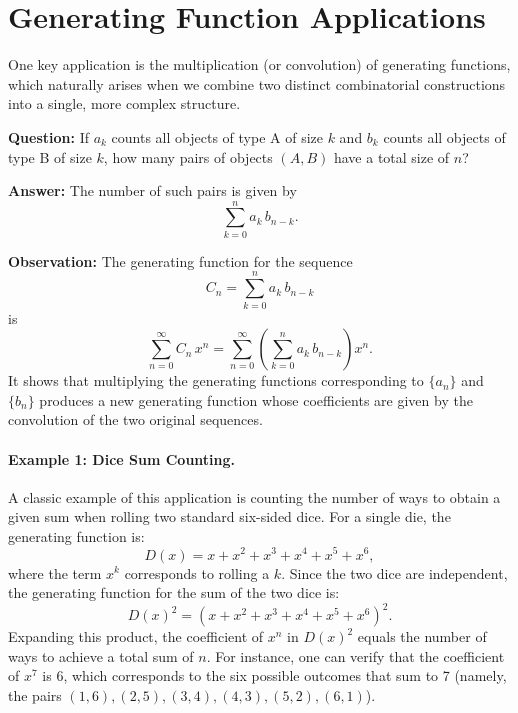 \documentclass[docmute]{article}
\begin{document}
\section{Generating Function Applications}

One key application is the multiplication (or convolution) of generating functions, which naturally arises when we combine two distinct combinatorial constructions into a single, more complex structure.

\textbf{Question:} If \(a_k\) counts all objects of type A of size \(k\) and \(b_k\) counts all objects of type B of size \(k\), how many pairs of objects \((A, B)\) have a total size of \(n\)?

\textbf{Answer:} The number of such pairs is given by
\[
\sum_{k=0}^{n} a_k\, b_{n-k}.
\]

\textbf{Observation:} The generating function for the sequence
\[
C_n = \sum_{k=0}^{n} a_k\, b_{n-k}
\]
is
\[
\sum_{n=0}^{\infty} C_n\, x^n = \sum_{n=0}^{\infty} \left(\sum_{k=0}^{n} a_k\, b_{n-k}\right)x^n.
\]
It shows that multiplying the generating functions corresponding to \( \{a_n\} \) and \( \{b_n\} \) produces a new generating function whose coefficients are given by the convolution of the two original sequences.



\bigskip
  
\paragraph{Example 1: Dice Sum Counting.}
A classic example of this application is counting the number of ways to obtain a given sum when rolling two standard six-sided dice. For a single die, the generating function is:
\[
D(x) = x + x^2 + x^3 + x^4 + x^5 + x^6,
\]
where the term \(x^k\) corresponds to rolling a \(k\). Since the two dice are independent, the generating function for the sum of the two dice is:
\[
D(x)^2 = \left(x + x^2 + x^3 + x^4 + x^5 + x^6\right)^2.
\]
Expanding this product, the coefficient of \(x^n\) in \(D(x)^2\) equals the number of ways to achieve a total sum of \(n\). For instance, one can verify that the coefficient of \(x^7\) is 6, which corresponds to the six possible outcomes that sum to 7 (namely, the pairs \((1,6), (2,5), (3,4), (4,3), (5,2), (6,1)\)).


\bigskip
\end{document}
